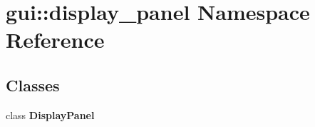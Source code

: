 \section{gui::display\_\-panel Namespace Reference}
\label{namespacegui_1_1display__panel}


\subsection*{Classes}
\begin{CompactItemize}
\item 
class {\bf DisplayPanel}
\end{CompactItemize}
